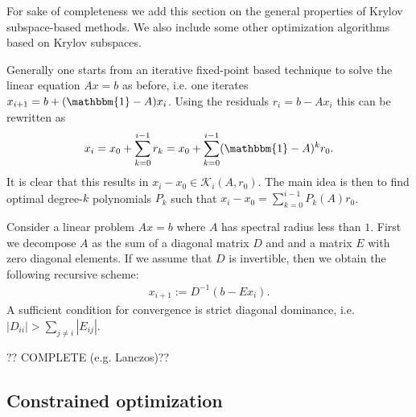 {    For sake of completeness we add this section on the general properties of Krylov subspace-based methods. We also include some other optimization algorithms based on Krylov subspaces.

    Generally one starts from an iterative fixed-point based technique to solve the linear equation $Ax=b$ as before, i.e. one iterates $x_{i+1} = b + (\mathbbm{1}-A)x_i$. Using the residuals $r_i = b - Ax_i$ this can be rewritten as
    \begin{gather}
        x_i = x_0 + \sum_{k=0}^{i-1}r_k = x_0 + \sum_{k=0}^{i-1}(\mathbbm{1}-A)^kr_0.
    \end{gather}
    It is clear that this results in $x_i-x_0\in\mathcal{K}_i(A, r_0)$. The main idea is then to find optimal degree-$k$ polynomials $P_k$ such that $x_i-x_0=\sum_{k=0}^{i-1}P_k(A)r_0$.

    \begin{method}
        Consider a linear problem $Ax=b$ where $A$ has spectral radius less than $1$. First we decompose $A$ as the sum of a diagonal matrix $D$ and and a matrix $E$ with zero diagonal elements. If we assume that $D$ is invertible, then we obtain the following recursive scheme:
        \begin{gather}
            x_{i+1} := D^{-1}(b-Ex_i).
        \end{gather}
        A sufficient condition for convergence is strict diagonal dominance, i.e. $|D_{ii}|>\sum_{j\neq i}|E_{ij}|$.
    \end{method}

    ?? COMPLETE (e.g. Lanczos)??

\subsection{Constrained optimization}

}
